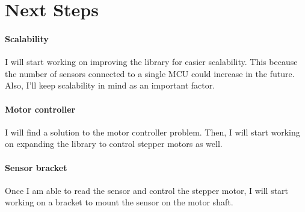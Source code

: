 \documentclass{article}
\begin{document}
\section{Next Steps}
\paragraph{Scalability}
I will start working on improving the library for easier scalability. This because the number of sensors connected to a single MCU could increase in the future. Also, I'll keep scalability in mind as an important factor.

\paragraph{Motor controller}
I will find a solution to the motor controller problem. Then, I will start working on expanding the library to control stepper motors as well.

\paragraph{Sensor bracket}
Once I am able to read the sensor and control the stepper motor, I will start working on a bracket to mount the sensor on the motor shaft.
\end{document}
